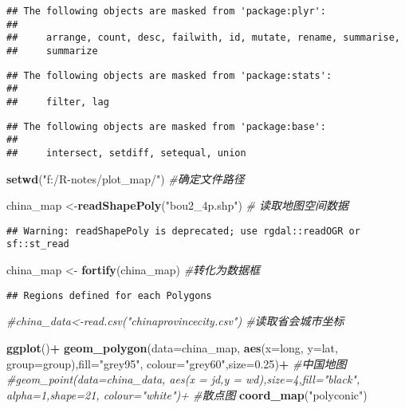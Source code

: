 \documentclass[]{article}
\newenvironment{Shaded}{\begin{snugshade}}{\end{snugshade}}
\newcommand{\KeywordTok}[1]{\textcolor[rgb]{0.13,0.29,0.53}{\textbf{#1}}}
\newcommand{\DataTypeTok}[1]{\textcolor[rgb]{0.13,0.29,0.53}{#1}}
\newcommand{\FloatTok}[1]{\textcolor[rgb]{0.00,0.00,0.81}{#1}}
\newcommand{\StringTok}[1]{\textcolor[rgb]{0.31,0.60,0.02}{#1}}
\newcommand{\CommentTok}[1]{\textcolor[rgb]{0.56,0.35,0.01}{\textit{#1}}}
\newcommand{\OperatorTok}[1]{\textcolor[rgb]{0.81,0.36,0.00}{\textbf{#1}}}
\newcommand{\NormalTok}[1]{#1}
\begin{document}
\begin{verbatim}
## The following objects are masked from 'package:plyr':
## 
##     arrange, count, desc, failwith, id, mutate, rename, summarise,
##     summarize
\end{verbatim}

\begin{verbatim}
## The following objects are masked from 'package:stats':
## 
##     filter, lag
\end{verbatim}

\begin{verbatim}
## The following objects are masked from 'package:base':
## 
##     intersect, setdiff, setequal, union
\end{verbatim}

\begin{Shaded}
\begin{Highlighting}[]
\KeywordTok{setwd}\NormalTok{(}\StringTok{"f:/R-notes/plot_map/"}\NormalTok{) }\CommentTok{#确定文件路径}

\NormalTok{china_map <-}\KeywordTok{readShapePoly}\NormalTok{(}\StringTok{"bou2_4p.shp"}\NormalTok{) }\CommentTok{# 读取地图空间数据}
\end{Highlighting}
\end{Shaded}

\begin{verbatim}
## Warning: readShapePoly is deprecated; use rgdal::readOGR or sf::st_read
\end{verbatim}

\begin{Shaded}
\begin{Highlighting}[]
\NormalTok{china_map <-}\StringTok{ }\KeywordTok{fortify}\NormalTok{(china_map) }\CommentTok{#转化为数据框}
\end{Highlighting}
\end{Shaded}

\begin{verbatim}
## Regions defined for each Polygons
\end{verbatim}

\begin{Shaded}
\begin{Highlighting}[]
\CommentTok{#china_data<-read.csv("chinaprovincecity.csv") #读取省会城市坐标}

\KeywordTok{ggplot}\NormalTok{()}\OperatorTok{+}
\StringTok{  }
\StringTok{  }\KeywordTok{geom_polygon}\NormalTok{(}\DataTypeTok{data=}\NormalTok{china_map, }\KeywordTok{aes}\NormalTok{(}\DataTypeTok{x=}\NormalTok{long, }\DataTypeTok{y=}\NormalTok{lat, }\DataTypeTok{group=}\NormalTok{group),}\DataTypeTok{fill=}\StringTok{"grey95"}\NormalTok{, }\DataTypeTok{colour=}\StringTok{"grey60"}\NormalTok{,}\DataTypeTok{size=}\FloatTok{0.25}\NormalTok{)}\OperatorTok{+}\StringTok{ }\CommentTok{#中国地图}
\StringTok{  }
\StringTok{  }\CommentTok{#geom_point(data=china_data, aes(x = jd,y = wd),size=4,fill="black", alpha=1,shape=21, colour="white")+ #散点图}
\StringTok{  }
\KeywordTok{coord_map}\NormalTok{(}\StringTok{"polyconic"}\NormalTok{) }
\end{Highlighting}
\end{Shaded}
\end{document}
